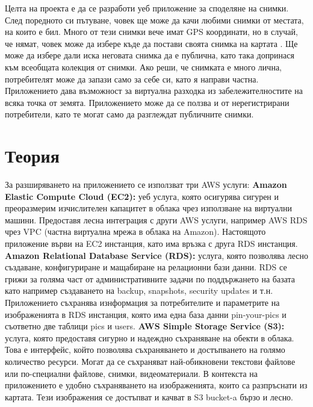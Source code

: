 \documentclass[12pt]{article}
\begin{document}
Целта на проекта е да се разработи уеб приложение за споделяне на снимки. След поредното си пътуване, човек ще може да качи любими снимки от местата, на които е бил. Много от тези снимки вече имат GPS координати, но в случай, че нямат, човек може да избере къде да постави своята снимка на картата . Ще може да избере дали иска неговата снимка да е публична, като така допринася към всеобщата колекция от снимки. Ако реши, че снимката е много лична, потребителят може да запази само за себе си, като я направи частна. Приложението дава възможност за виртуална разходка из забележителностите на всяка точка от земята. Приложението може да се ползва и от нерегистрирани потребители, като те могат само да разглеждат публичните снимки.
\newpage
\section{Теория}
За разширяването на приложението се използват три AWS услуги:
\medskip\newline
\noindent \textbf{Amazon Elastic Compute Cloud (EC2):} уеб услуга, която осигурява сигурен и преоразмерим изчислителен капацитет в облака чрез използване на виртуални машини. Предоставя лесна интеграция с други AWS услуги, например AWS RDS чрез VPC (частна виртуална мрежа в облака на Amazon). Настоящото приложение върви на EC2 инстанция, като има връзка с друга RDS инстанция.
\medskip\newline
\noindent \textbf{Amazon Relational Database Service (RDS):} услуга, която позволява лесно създаване, конфигуриране и мащабиране на релационни бази данни. RDS се грижи за голяма част от административните задачи по поддържането на базата като например създаването на backup, snapshots, security updates и т.н. Приложението съхранява изнформация за потребителите и параметрите на изображенията в RDS инстанция, която има една база данни pin-your-pics и съответно две таблици pics и users.
\medskip\newline
\noindent \textbf{AWS Simple Storage Service (S3):} услуга, която предоставя сигурно и надеждно съхраняване на обекти в облака. Това е интерфейс, който позволява съхраняването и достъпването на голямо количество ресурси. Могат да се съхраняват най-обикновени текстови файлове или по-специални файлове, снимки, видеоматериали. В контекста на приложението е удобно съхраняването на изображенията, които са разпръснати из картата. Тези изображения се достъпват и качват в S3 bucket-a бързо и лесно.
\medskip

\medskip
\end{document}
